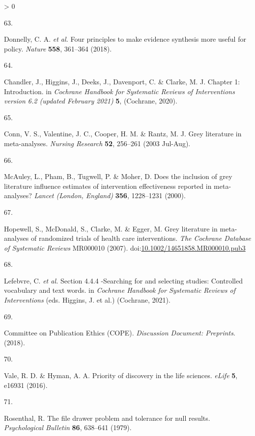 \documentclass[a4paper, twoside]{templates/ociamthesis}
\newlength{\cslhangindent}
\newlength{\csllabelwidth}
\newenvironment{CSLReferences}[3] %
 {%
  \setlength{\parindent}{0pt}
  \ifodd #1 \everypar{\setlength{\hangindent}{\cslhangindent}}\ignorespaces\fi
  \ifnum #2 > 0
  \setlength{\parskip}{#2\baselineskip}
  \fi
 }%
 {}
\newcommand{\CSLLeftMargin}[1]{\parbox[t]{\maxof{\widthof{#1}}{\csllabelwidth}}{#1}}
\newcommand{\CSLRightInline}[1]{\parbox[t]{\linewidth - \csllabelwidth}{#1}}
\begin{document}
\begin{CSLReferences}{0}{0}
\leavevmode\hypertarget{ref-donnelly2018a}{}%
\CSLLeftMargin{63. }
\CSLRightInline{Donnelly, C. A. \emph{et al.} Four principles to make evidence synthesis more useful for policy. \emph{Nature} \textbf{558}, 361--364 (2018).}

\leavevmode\hypertarget{ref-chandler2019chapter}{}%
\CSLLeftMargin{64. }
\CSLRightInline{Chandler, J., Higgins, J., Deeks, J., Davenport, C. \& Clarke, M. J. Chapter 1: {Introduction}. in \emph{Cochrane {Handbook} for {Systematic Reviews} of {Interventions} version 6.2 (updated {February} 2021)} \textbf{5}, ({Cochrane}, 2020).}

\leavevmode\hypertarget{ref-conn2003}{}%
\CSLLeftMargin{65. }
\CSLRightInline{Conn, V. S., Valentine, J. C., Cooper, H. M. \& Rantz, M. J. Grey literature in meta-analyses. \emph{Nursing Research} \textbf{52}, 256--261 (2003 Jul-Aug).}

\leavevmode\hypertarget{ref-mcauley2000}{}%
\CSLLeftMargin{66. }
\CSLRightInline{McAuley, L., Pham, B., Tugwell, P. \& Moher, D. Does the inclusion of grey literature influence estimates of intervention effectiveness reported in meta-analyses? \emph{Lancet (London, England)} \textbf{356}, 1228--1231 (2000).}

\leavevmode\hypertarget{ref-hopewell2007}{}%
\CSLLeftMargin{67. }
\CSLRightInline{Hopewell, S., McDonald, S., Clarke, M. \& Egger, M. Grey literature in meta-analyses of randomized trials of health care interventions. \emph{The Cochrane Database of Systematic Reviews} MR000010 (2007). doi:\href{https://doi.org/10.1002/14651858.MR000010.pub3}{10.1002/14651858.MR000010.pub3}}

\leavevmode\hypertarget{ref-lefebvre2019searching}{}%
\CSLLeftMargin{68. }
\CSLRightInline{Lefebvre, C. \emph{et al.} Section 4.4.4 -{Searching} for and selecting studies: {Controlled} vocabulary and text words. in \emph{Cochrane {Handbook} for {Systematic Reviews} of {Interventions}} (eds. Higgins, J. et al.) ({Cochrane}, 2021).}

\leavevmode\hypertarget{ref-committeeonpublicationethicscope2018}{}%
\CSLLeftMargin{69. }
\CSLRightInline{Committee on Publication Ethics (COPE). \emph{Discussion {Document}: {Preprints}}. (2018).}

\leavevmode\hypertarget{ref-vale2016}{}%
\CSLLeftMargin{70. }
\CSLRightInline{Vale, R. D. \& Hyman, A. A. Priority of discovery in the life sciences. \emph{eLife} \textbf{5}, e16931 (2016).}

\leavevmode\hypertarget{ref-rosenthal1979}{}%
\CSLLeftMargin{71. }
\CSLRightInline{Rosenthal, R. The file drawer problem and tolerance for null results. \emph{Psychological Bulletin} \textbf{86}, 638--641 (1979).}


\end{CSLReferences}
\end{document}
